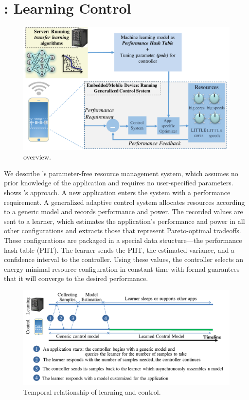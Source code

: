 \section{\SYSTEM{}: Learning Control}
\label{sec:framework}

\begin{figure}
  \includegraphics[width=\columnwidth]{figures/Overview.pdf}
  \caption{\SYSTEM{} overview.}
  \label{fig:overview}
\end{figure}


We describe \SYSTEM{}'s parameter-free resource management system,
which assumes no prior knowledge of the application and requires no
user-specified parameters.   shows \SYSTEM{}'s
approach.  A new application enters the system with a performance
requirement.  A generalized adaptive control system allocates
resources according to a generic model and records performance and
power.  The recorded values are sent to a learner, which estimates the
application's performance and power in all other configurations and
extracts those that represent Pareto-optimal tradeoffs.  These
configurations are packaged in a special data structure---the
performance hash table (PHT).  The learner sends the PHT, the
estimated variance, and a confidence interval to the controller.
Using these values, the controller selects an energy minimal resource
configuration in constant time with formal guarantees that it will
converge to the desired performance.

\begin{figure}
  \includegraphics[width=\columnwidth]{figures/Timeline.pdf}
  \caption{Temporal relationship of learning and control.}
  \label{fig:timeline}
\end{figure}

